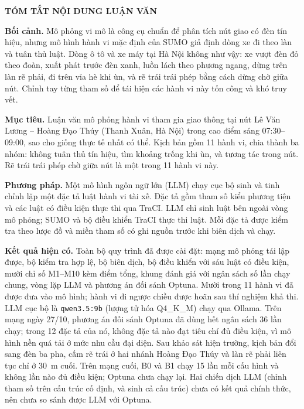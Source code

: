 \documentclass[../DoAn.tex]{subfiles}
\begin{document}
\begin{center}
    \Large{\textbf{TÓM TẮT NỘI DUNG LUẬN VĂN}}\\
\end{center}
\vspace{1cm}
\textbf{Bối cảnh.} Mô phỏng vi mô là công cụ chuẩn để phân tích nút giao có đèn tín hiệu, nhưng mô hình hành vi mặc định của SUMO giả định dòng xe đi theo làn và tuân thủ luật. Dòng ô tô và xe máy tại Hà Nội không như vậy: xe vượt đèn đỏ theo đoàn, xuất phát trước đèn xanh, luồn lách theo phương ngang, dừng trên làn rẽ phải, đi trên vỉa hè khi ùn, và rẽ trái trái phép bằng cách dừng chờ giữa nút. Chỉnh tay từng tham số để tái hiện các hành vi này tốn công và khó truy vết.

\textbf{Mục tiêu.} Luận văn mô phỏng hành vi tham gia giao thông tại nút Lê Văn Lương -- Hoàng Đạo Thúy (Thanh Xuân, Hà Nội) trong cao điểm sáng 07:30--09:00, sao cho giống thực tế nhất có thể. Kịch bản gồm 11 hành vi, chia thành ba nhóm: không tuân thủ tín hiệu, tìm khoảng trống khi ùn, và tương tác trong nút. Rẽ trái trái phép chờ giữa nút là một trong 11 hành vi này.

\textbf{Phương pháp.} Một mô hình ngôn ngữ lớn (LLM) chạy cục bộ sinh và tinh chỉnh lặp một đặc tả luật hành vi tài xế. Đặc tả gồm tham số kiểu phương tiện và các luật có điều kiện thực thi qua TraCI. LLM chỉ sinh luật bên ngoài vòng mô phỏng; SUMO và bộ điều khiển TraCI thực thi luật. Mỗi đặc tả được kiểm tra theo lược đồ và miền tham số có ghi nguồn trước khi biên dịch và chạy.

\textbf{Kết quả hiện có.} Toàn bộ quy trình đã được cài đặt: mạng mô phỏng tái lập được, bộ kiểm tra hợp lệ, bộ biên dịch, bộ điều khiển với sáu luật có điều kiện, mười chỉ số M1--M10 kèm điểm tổng, khung đánh giá với ngân sách số lần chạy chung, vòng lặp LLM và phương án đối sánh Optuna. Mười trong 11 hành vi đã được đưa vào mô hình; hành vi đi ngược chiều được hoãn sau thí nghiệm khả thi. LLM cục bộ là \texttt{qwen3.5:9b} (lượng tử hóa Q4\_K\_M) chạy qua Ollama. Trên mạng ngày 27/10, phương án đối sánh Optuna đã dùng hết ngân sách 36 lần chạy; trong 12 đặc tả của nó, không đặc tả nào đạt tiêu chí đủ điều kiện, vì mô hình nền quá tải ở mức nhu cầu đại diện. Sau khảo sát hiện trường, kịch bản đổi sang đèn ba pha, cấm rẽ trái ở hai nhánh Hoàng Đạo Thúy và làn rẽ phải liên tục chỉ ở 30~m cuối. Trên mạng cuối, B0 và B1 chạy 15 lần mỗi cấu hình và không lần nào đủ điều kiện; Optuna chưa chạy lại. Hai chiến dịch LLM (chỉnh tham số trên cấu trúc cố định, và sinh cả cấu trúc) chưa có kết quả chính thức, nên chưa so sánh được LLM với Optuna.
\end{document}
